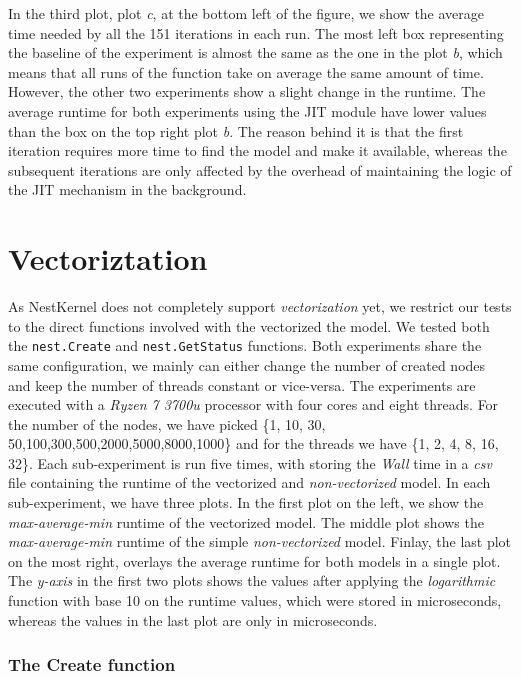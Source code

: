 In the third plot, plot \emph{c}, at the bottom left of the figure, we show the average time needed by all the 151 iterations in each run. The most left box representing the baseline of the experiment is almost the same as the one in the plot \emph{b}, which means that all runs of the function take on average the same amount of time. However, the other two experiments show a slight change in the runtime. The average runtime for both experiments using the JIT module have lower values than the box on the top right plot \emph{b}. The reason behind it is that the first iteration requires more time to find the model and make it available, whereas the subsequent iterations are only affected by the overhead of maintaining the logic of the JIT mechanism in the background.



\section{Vectoriztation}

As NestKernel does not completely support \emph	{vectorization} yet, we restrict our tests to the direct functions involved with the vectorized the model. We tested both the \texttt{nest.Create} and \texttt{nest.GetStatus} functions. Both experiments share the same configuration, we mainly can either change the number of created nodes and keep the number of threads constant or vice-versa. The experiments are executed with a \emph{Ryzen 7 3700u} processor with four cores and eight threads.
For the number of the nodes, we have picked \{1, 10, 30, 50,100,300,500,2000,5000,8000,1000\} and for the threads we have \{1, 2, 4, 8, 16, 32\}. Each sub-experiment is run five times, with storing the \emph{Wall} time in a \emph{csv} file containing the runtime of the vectorized and \emph{non-vectorized} model. In each sub-experiment, we have three plots. In the first plot on the left, we show the \emph{max-average-min} runtime of the vectorized model. The middle plot shows the \emph{max-average-min} runtime of the simple \emph{non-vectorized} model. Finlay, the last plot on the most right, overlays the average runtime for both models in a single plot. The \emph{y-axis} in the first two plots shows the values after applying the \emph{logarithmic} function with base 10 on the runtime values, which were stored in microseconds, whereas the values in the last plot are only in microseconds.

\subsubsection{The Create function}

